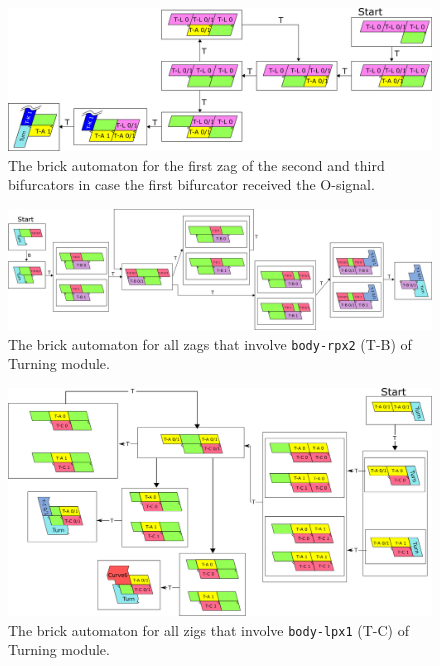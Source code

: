 \documentclass[dvipdfmx,review]{elsarticle}
\begin{document}
\begin{figure}[ht]
\centering
\includegraphics[width=\linewidth]{Figs/Turner_BA/T-A_afterO.png}
\caption{The brick automaton for the first zag of the second and third bifurcators in case the first bifurcator received the O-signal.}
\label{fig:BA_T-A_afterO}
\end{figure}


\begin{figure}[ht]
\centering
\includegraphics[width=\linewidth]{Figs/Turner_BA/T-B.png}
\caption{The brick automaton for all zags that involve \texttt{body-rpx2} (T-B) of Turning module.}
\label{fig:BA_T-B}
\end{figure}

\begin{figure}[ht]
\centering
\includegraphics[width=\linewidth]{Figs/Turner_BA/T-C_ver2.png}
\caption{The brick automaton for all zigs that involve \texttt{body-lpx1} (T-C) of Turning module.}
\label{fig:BA_T-C}
\end{figure}
\end{document}
